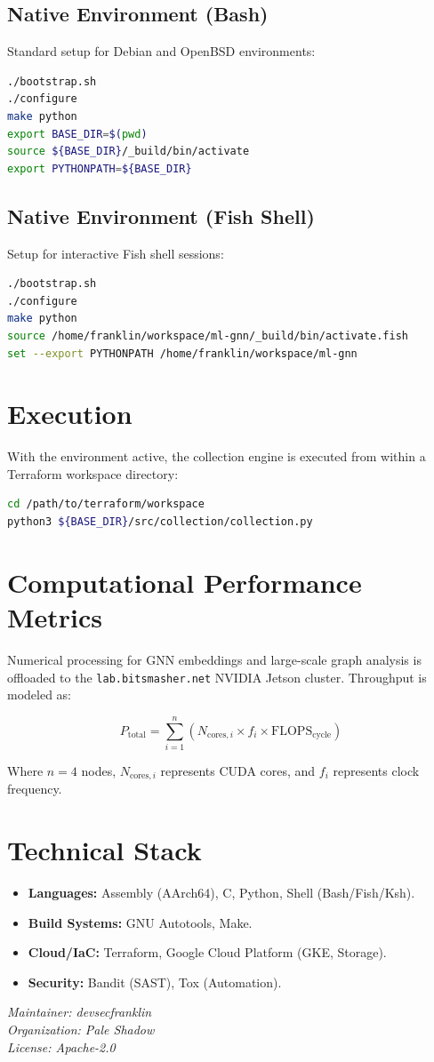 \documentclass[11pt,a4paper]{article}
\begin{document}
\subsection{Native Environment (Bash)}
Standard setup for Debian and OpenBSD environments:
\begin{lstlisting}[language=bash]
./bootstrap.sh
./configure
make python
export BASE_DIR=$(pwd)
source ${BASE_DIR}/_build/bin/activate
export PYTHONPATH=${BASE_DIR}
\end{lstlisting}

\subsection{Native Environment (Fish Shell)}
Setup for interactive Fish shell sessions:
\begin{lstlisting}[language=bash]
./bootstrap.sh
./configure
make python
source /home/franklin/workspace/ml-gnn/_build/bin/activate.fish
set --export PYTHONPATH /home/franklin/workspace/ml-gnn
\end{lstlisting}

\section{Execution}
With the environment active, the collection engine is executed from within a Terraform workspace directory:

\begin{lstlisting}[language=bash]
cd /path/to/terraform/workspace
python3 ${BASE_DIR}/src/collection/collection.py
\end{lstlisting}

\section{Computational Performance Metrics}
Numerical processing for GNN embeddings and large-scale graph analysis is offloaded to the \texttt{lab.bitsmasher.net} NVIDIA Jetson cluster. Throughput is modeled as:

\begin{equation}
P_{\text{total}} = \sum_{i=1}^{n} (N_{\text{cores}, i} \times f_{i} \times \text{FLOPS}_{\text{cycle}})
\end{equation}

Where $n=4$ nodes, $N_{\text{cores}, i}$ represents CUDA cores, and $f_{i}$ represents clock frequency.

\section{Technical Stack}
\begin{itemize}
    \item \textbf{Languages:} Assembly (AArch64), C, Python, Shell (Bash/Fish/Ksh).
    \item \textbf{Build Systems:} GNU Autotools, Make.
    \item \textbf{Cloud/IaC:} Terraform, Google Cloud Platform (GKE, Storage).
    \item \textbf{Security:} Bandit (SAST), Tox (Automation).
\end{itemize}

\vspace{2em}
\noindent\textit{Maintainer: devsecfranklin}\\
\textit{Organization: Pale Shadow}\\
\textit{License: Apache-2.0}
\end{document}
